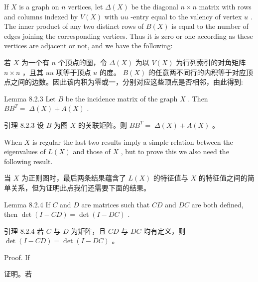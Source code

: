 \documentclass[10pt]{article}
\begin{document}
If \(X\) is a graph on \(n\) vertices, let \(\Delta \left( X\right)\) be the diagonal \(n \times  n\) matrix with rows and columns indexed by \(V\left( X\right)\) with \({uu}\) -entry equal to the valency of vertex \(u\) . The inner product of any two distinct rows of \(B\left( X\right)\) is equal to the number of edges joining the corresponding vertices. Thus it is zero or one according as these vertices are adjacent or not, and we have the following:

\begin{tcolorbox}\relax
若 \(X\) 为一个有 \(n\) 个顶点的图，令 \(\Delta \left( X\right)\) 为以 \(V\left( X\right)\) 为行列索引的对角矩阵 \(n \times  n\) ，且其 \({uu}\) 项等于顶点 \(u\) 的度。 \(B\left( X\right)\) 的任意两不同行的内积等于对应顶点之间的边数。因此该内积为零或一，分别对应这些顶点是否相邻，由此得到:
\end{tcolorbox}

Lemma 8.2.3 Let \(B\) be the incidence matrix of the graph \(X\) . Then \(B{B}^{T} = \; \Delta \left( X\right)  + A\left( X\right)\) .

\begin{tcolorbox}\relax
引理 8.2.3 设 \(B\) 为图 \(X\) 的关联矩阵。则 \(B{B}^{T} = \; \Delta \left( X\right)  + A\left( X\right)\) 。
\end{tcolorbox}

When \(X\) is regular the last two results imply a simple relation between the eigenvalues of \(L\left( X\right)\) and those of \(X\) , but to prove this we also need the following result.

\begin{tcolorbox}\relax
当 \(X\) 为正则图时，最后两条结果蕴含了 \(L\left( X\right)\) 的特征值与 \(X\) 的特征值之间的简单关系，但为证明此点我们还需要下面的结果。
\end{tcolorbox}

Lemma 8.2.4 If \(C\) and \(D\) are matrices such that \({CD}\) and \({DC}\) are both defined, then \(\det \left( {I - {CD}}\right)  = \det \left( {I - {DC}}\right)\) .

\begin{tcolorbox}\relax
引理 8.2.4 若 \(C\) 与 \(D\) 为矩阵，且 \({CD}\) 与 \({DC}\) 均有定义，则 \(\det \left( {I - {CD}}\right)  = \det \left( {I - {DC}}\right)\) 。
\end{tcolorbox}

Proof. If

\begin{tcolorbox}\relax
证明。若
\end{tcolorbox}
\end{document}
